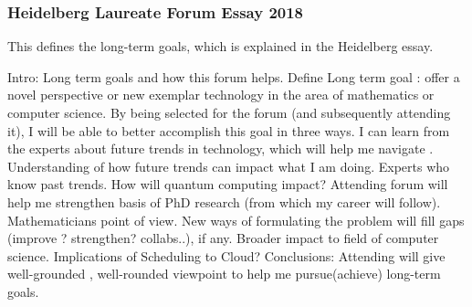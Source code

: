 \begin{frame}
\frametitle{Heidelberg Laureate Forum Essay 2018}
{\tiny This defines the long-term goals, which is explained in the Heidelberg essay}.\\ 
\begin{outline}[enumerate]
\tiny \1 {\tiny Intro: Long term goals and how this forum helps. } 
\tiny \2 {\tiny Define Long term goal : offer a novel perspective or 
new exemplar technology in the area of mathematics or computer
science.} 
\tiny \2 {\tiny By being selected for the forum (and subsequently
  attending it), I will be able to better accomplish this goal in
  three ways.} 
\tiny \1 {\tiny I can learn from the experts about future trends in technology, which will help me navigate .} 
\tiny \2 {\tiny Understanding of how future trends can impact what I am doing.}
\tiny \2 {\tiny Experts who know past trends. How will quantum
  computing impact?} 
\tiny \1 {\tiny Attending forum will help me strengthen basis of PhD 
  research (from which my career will follow). Mathematicians point of view. } 
\tiny \2 {\tiny New ways of formulating the problem will fill gaps (improve ? strengthen? collabs..), if any. %
}
\tiny \1  {\tiny Broader impact to field of computer science. } 
\tiny \2 {\tiny  Implications of Scheduling to Cloud?} 
\tiny \1 {\tiny Conclusions: Attending will give well-grounded ,
  well-rounded viewpoint to help me pursue(achieve) long-term goals.} 
\end{outline}  
\end{frame}


